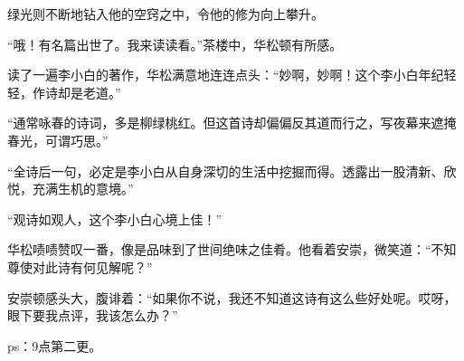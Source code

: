\begin{this_body}
绿光则不断地钻入他的空窍之中，令他的修为向上攀升。

“哦！有名篇出世了。我来读读看。”茶楼中，华松顿有所感。

读了一遍李小白的著作，华松满意地连连点头：“妙啊，妙啊！这个李小白年纪轻轻，作诗却是老道。”

“通常咏春的诗词，多是柳绿桃红。但这首诗却偏偏反其道而行之，写夜幕来遮掩春光，可谓巧思。”

“全诗后一句，必定是李小白从自身深切的生活中挖掘而得。透露出一股清新、欣悦，充满生机的意境。”

“观诗如观人，这个李小白心境上佳！”

华松啧啧赞叹一番，像是品味到了世间绝味之佳肴。他看着安崇，微笑道：“不知尊使对此诗有何见解呢？”

安崇顿感头大，腹诽着：“如果你不说，我还不知道这诗有这么些好处呢。哎呀，眼下要我点评，我该怎么办？”

ps：9点第二更。

\end{this_body}

